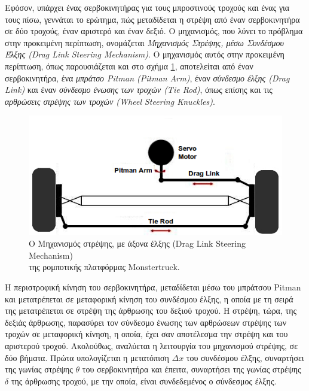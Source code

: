 \bigskip
Εφόσον, υπάρχει ένας σερβοκινητήρας για τους μπροστινούς τροχούς και ένας για τους πίσω, γεννάται το ερώτημα, πώς μεταδίδεται η στρέψη από έναν σερβοκινητήρα σε δύο τροχούς, έναν αριστερό και έναν δεξιό. Ο μηχανισμός, που λύνει το πρόβλημα στην προκειμένη περίπτωση, ονομάζεται \textit{Μηχανισμός Στρέψης, μέσω Συνδέσμου Έλξης (Drag Link Steering Mechanism)}. Ο  μηχανισμός αυτός στην προκειμένη περίπτωση, όπως παρουσιάζεται και στο σχήμα \ref{fig:drag_link_steering}, αποτελείται από έναν σερβοκινητήρα, ένα \textit{μπράτσο Pitman (Pitman Arm)}, έναν \textit{σύνδεσμο έλξης (Drag Link)} και έναν \textit{σύνδεσμο ένωσης των τροχών (Tie Rod)}, όπως επίσης και τις \textit{αρθρώσεις στρέψης των τροχών (Wheel Steering Knuckles)}.

\begin{figure}[!ht]
	\centering
	\includegraphics[width=0.6\linewidth]{Chapters/Chapter2/Figures/my_drag_link_steering.png}
	\caption{Ο Μηχανισμός στρέψης, με άξονα έλξης (Drag Link Steering Mechanism)
	\\της ρομποτικής πλατφόρμας Monstertruck.}
	\label{fig:drag_link_steering}
\end{figure}

\bigskip
Η περιστροφική κίνηση του σερβοκινητήρα, μεταδίδεται μέσω του {μπράτσου Pitman} και μετατρέπεται σε μεταφορική κίνηση του {συνδέσμου έλξης}, η οποία με τη σειρά της μετατρέπεται σε στρέψη της άρθρωσης του δεξιού τροχού. Η στρέψη, τώρα, της δεξιάς άρθρωσης, παρασύρει τον {σύνδεσμο ένωσης} των αρθρώσεων στρέψης των τροχών σε μεταφορική κίνηση, η οποία, έχει σαν αποτέλεσμα την στρέψη και του αριστερού τροχού. Ακολούθως, αναλύεται η λειτουργία του μηχανισμού στρέψης, σε δύο βήματα. Πρώτα υπολογίζεται η μετατόπιση $\Delta x$ του {συνδέσμου έλξης}, συναρτήσει της γωνίας στρέψης $\theta$ του σερβοκινητήρα και έπειτα, συναρτήσει της γωνίας στρέψης $\delta$ της άρθρωσης τροχού, με την οποία, είναι συνδεδεμένος ο {σύνδεσμος έλξης}.


